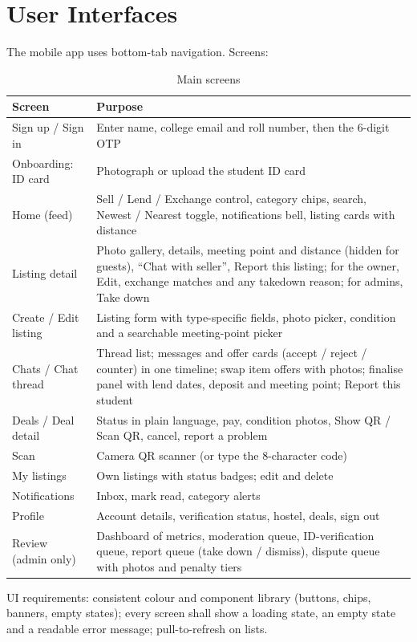 \documentclass[11pt,a4paper]{scrreprt}
\begin{document}
\section{User Interfaces}
The mobile app uses bottom-tab navigation. Screens:
\begin{longtable}{L{3.6cm} L{11.6cm}}
\caption{Main screens}\label{tab:screens}\\
\toprule
\textbf{Screen} & \textbf{Purpose}\\ \midrule\endhead
Sign up / Sign in & Enter name, college email and roll number, then the 6-digit OTP\\
Onboarding: ID card & Photograph or upload the student ID card\\
Home (feed) & Sell / Lend / Exchange control, category chips, search, Newest / Nearest toggle, notifications bell, listing cards with distance\\
Listing detail & Photo gallery, details, meeting point and distance (hidden for guests), ``Chat with seller'', Report this listing; for the owner, Edit, exchange matches and any takedown reason; for admins, Take down\\
Create / Edit listing & Listing form with type-specific fields, photo picker, condition and a searchable meeting-point picker\\
Chats / Chat thread & Thread list; messages and offer cards (accept / reject / counter) in one timeline; swap item offers with photos; finalise panel with lend dates, deposit and meeting point; Report this student\\
Deals / Deal detail & Status in plain language, pay, condition photos, Show QR / Scan QR, cancel, report a problem\\
Scan & Camera QR scanner (or type the 8-character code)\\
My listings & Own listings with status badges; edit and delete\\
Notifications & Inbox, mark read, category alerts\\
Profile & Account details, verification status, hostel, deals, sign out\\
Review (admin only) & Dashboard of metrics, moderation queue, ID-verification queue, report queue (take down / dismiss), dispute queue with photos and penalty tiers\\
\bottomrule
\end{longtable}
UI requirements: consistent colour and component library (buttons,
chips, banners, empty states); every screen shall show a loading state,
an empty state and a readable error message; pull-to-refresh on lists.
\end{document}
